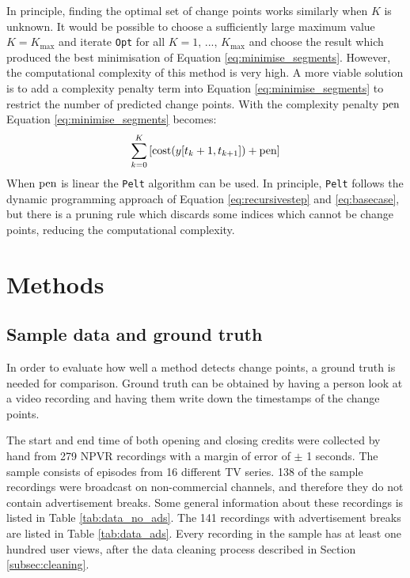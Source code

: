 In principle, finding the optimal set of change points works similarly when $K$ is unknown. It would be possible to choose a sufficiently large maximum value $K=K_{\text{max}}$ and iterate \texttt{Opt} for all $K=1\text{, ..., }K_{\text{max}}$ and choose the result which produced the best minimisation of Equation \ref{eq:minimise_segments}. However, the computational complexity of this method is very high. A more viable solution is to add a complexity penalty term into Equation \ref{eq:minimise_segments} to restrict the number of predicted change points. With the complexity penalty $\operatorname{pen}$ Equation \ref{eq:minimise_segments} becomes:
\begin{equation}
  \sum_{k=0} ^{K} \left[ \operatorname{cost}(y[t_k+1,t_{k+1}]) + \operatorname{pen} \right]
  \label{eq:minimise_segments_pen}
\end{equation}
When $\operatorname{pen}$ is linear the \texttt{Pelt} algorithm can be used. In principle, \texttt{Pelt} follows the dynamic programming approach of Equation \ref{eq:recursivestep} and \ref{eq:basecase}, but there is a pruning rule which discards some indices which cannot be change points, reducing the computational complexity. \cite{killickOptimalDetectionChangepoints2012}

\newpage
\section{Methods} \label{sec:casestudy}

\subsection{Sample data and ground truth} \label{subsec:groundtruth}

In order to evaluate how well a method detects change points, a ground truth is needed for comparison. Ground truth can be obtained by having a person look at a video recording and having them write down the timestamps of the change points.

The start and end time of both opening and closing credits were collected by hand from 279 NPVR recordings with a margin of error of $\pm$ 1 seconds. The sample consists of episodes from 16 different TV series. 138 of the sample recordings were broadcast on non-commercial channels, and therefore they do not contain advertisement breaks. Some general information about these recordings is listed in Table \ref{tab:data_no_ads}. The 141 recordings with advertisement breaks are listed in Table \ref{tab:data_ads}. Every recording in the sample has at least one hundred user views, after the data cleaning process described in Section \ref{subsec:cleaning}. 


